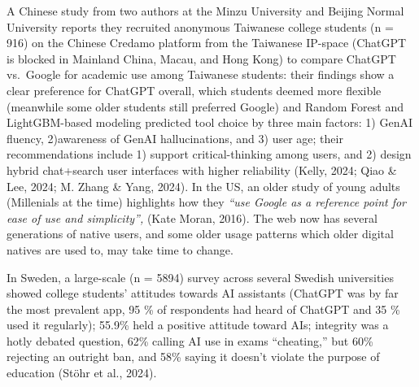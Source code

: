 \documentclass[
  12pt,
  letterpaper,
  DIV=11,
  numbers=noendperiod]{scrartcl}
\begin{document}
A Chinese study from two authors at the Minzu University and Beijing
Normal University reports they recruited anonymous Taiwanese college
students (n = 916) on the Chinese Credamo platform from the Taiwanese
IP-space (ChatGPT is blocked in Mainland China, Macau, and Hong Kong) to
compare ChatGPT vs.~Google for academic use among Taiwanese students:
their findings show a clear preference for ChatGPT overall, which
students deemed more flexible (meanwhile some older students still
preferred Google) and Random Forest and LightGBM-based modeling
predicted tool choice by three main factors: 1) GenAI fluency,
2)awareness of GenAI hallucinations, and 3) user age; their
recommendations include 1) support critical-thinking among users, and 2)
design hybrid chat+search user interfaces with higher reliability
(Kelly, 2024; Qiao \& Lee, 2024; M. Zhang \& Yang, 2024). In the US, an
older study of young adults (Millenials at the time) highlights how they
\emph{``use Google as a reference point for ease of use and
simplicity'',} (Kate Moran, 2016). The web now has several generations
of native users, and some older usage patterns which older digital
natives are used to, may take time to change.

In Sweden, a large-scale (n = 5894) survey across several Swedish
universities showed college students' attitudes towards AI assistants
(ChatGPT was by far the most prevalent app, 95 \% of respondents had
heard of ChatGPT and 35 \% used it regularly); 55.9\% held a positive
attitude toward AIs; integrity was a hotly debated question, 62\%
calling AI use in exams ``cheating,'' but 60\% rejecting an outright
ban, and 58\% saying it doesn't violate the purpose of education (Stöhr
et al., 2024).
\end{document}
